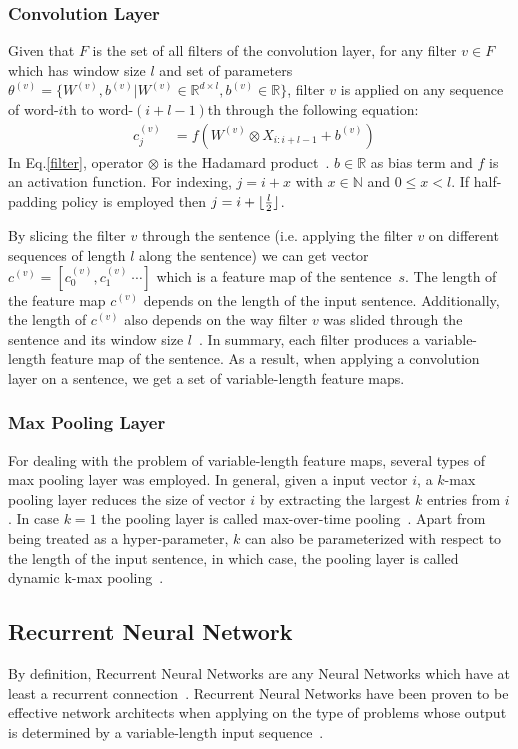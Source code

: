 \subsubsection{Convolution Layer}\label{conv-layer}
Given that \(F\) is the set of all filters of the convolution layer, for any filter \(v \in F\) which has window size \(l\) and set of parameters \(\theta^{(v)} = \{ W^{(v)}, b^{(v)} | W^{(v)} \in \mathbb{R}^{d \times l}, b^{(v)} \in \mathbb{R}\}\), filter \({v}\) is applied on any sequence of word-\(i\)th to word-\((i+l-1)\)th through the following equation:
\begin{align}
c^{(v)}_j &= f(W^{(v)} \otimes X_{i:i+l-1} + b^{(v)}) &\label{filter}
\end{align}
In Eq.\eqref{filter}, operator \(\otimes\) is the Hadamard product~\cite{element-prod}.  
\(b \in \mathbb{R}\) as bias term and \(f\) is an activation function.
For indexing, \(j = i + x\) with \(x \in \mathbb{N}\) and \(0 \leq x < l\).
If half-padding policy is employed then \(j = i + \lfloor \frac{l}{2} \rfloor\).

By slicing the filter \(v\) through the sentence (i.e. applying the filter \(v\) on different sequences of length \(l\) along the sentence) we can get vector \(c^{(v)} = [c^{(v)}_0, c^{(v)}_1~\cdots]\) which is a feature map of the sentence~\(s\).
The length of the feature map \(c^{(v)}\) depends on the length of the input sentence.
Additionally, the length of \(c^{(v)}\) also depends on the way filter \(v\) was slided through the sentence and its window size \(l\)~\cite{conv-arith}.
In summary, each filter produces a variable-length feature map of the sentence.
As a result, when applying a convolution layer on a sentence, we get a set of variable-length feature maps.
\subsubsection{Max Pooling Layer}
For dealing with the problem of variable-length feature maps, several types of max pooling layer was employed.
In general, given a input vector \(i\), a \(k\)-max pooling layer reduces the size of vector \(i\) by extracting the largest \(k\) entries from \(i\).
In case \(k = 1\) the pooling layer is called max-over-time pooling~\cite{nlp-scratch,KimCNN}.
Apart from being treated as a hyper-parameter, \(k\) can also be parameterized with respect to the length of the input sentence, in which case, the pooling layer is called dynamic k-max pooling~\cite{DCNN}.
\subsection{Recurrent Neural Network}
By definition, Recurrent Neural Networks are any Neural Networks which have at least a recurrent connection~\cite{rnn-def}.
Recurrent Neural Networks have been proven to be effective network architects when applying on the type of problems whose output is determined by a variable-length input sequence~\cite{speech-lstm,SutskeverVL14,mikolov-nlm}.
